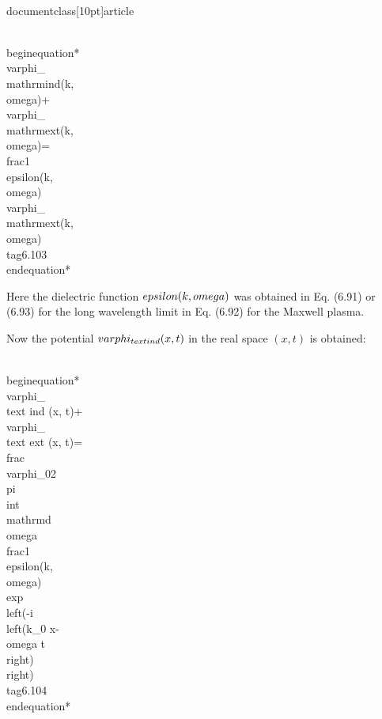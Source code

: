\\documentclass[10pt]{article}
\begin{document}
{{{{\\begin{equation*}
\\varphi_{\\mathrm{ind}}(k, \\omega)+\\varphi_{\\mathrm{ext}}(k, \\omega)=\\frac{1}{\\epsilon(k, \\omega)} \\varphi_{\\mathrm{ext}}(k, \\omega) \\tag{6.103}
\\end{equation*}


Here the dielectric function $\\epsilon(k, \\omega)$ was obtained in Eq. (6.91) or (6.93) for the long wavelength limit in Eq. (6.92) for the Maxwell plasma.

Now the potential $\\varphi_{\\text {ind }}(x, t)$ in the real space $(x, t)$ is obtained:


\\begin{equation*}
\\varphi_{\\text {ind }}(x, t)+\\varphi_{\\text {ext }}(x, t)=\\frac{\\varphi_{0}}{2 \\pi} \\int \\mathrm{d} \\omega \\frac{1}{\\epsilon(k, \\omega)} \\exp \\left(-i\\left(k_{0} x-\\omega t\\right)\\right) \\tag{6.104}
\\end{equation*}


}}}}
\end{document}
